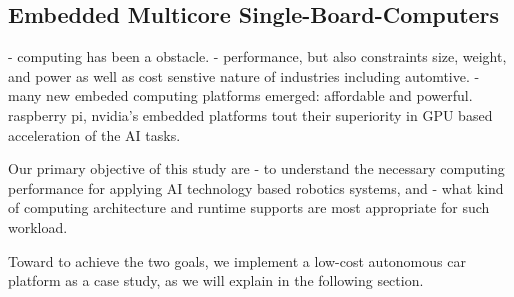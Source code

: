 


\subsection{Embedded Multicore Single-Board-Computers}

- computing has been a obstacle.
- performance, but also constraints size, weight, and power as well as
cost senstive nature of industries including automtive.
- many new embeded computing platforms emerged: affordable and
powerful. raspberry pi, nvidia's embedded platforms tout their
superiority in GPU based acceleration of the AI tasks.

Our primary objective of this study are
- to understand the necessary computing performance for applying AI
technology based robotics systems, and 
- what kind of computing architecture and runtime supports
are most appropriate for such workload.

Toward to achieve the two goals, we implement a low-cost autonomous
car platform as a case study, as we will explain in the following
section. 
